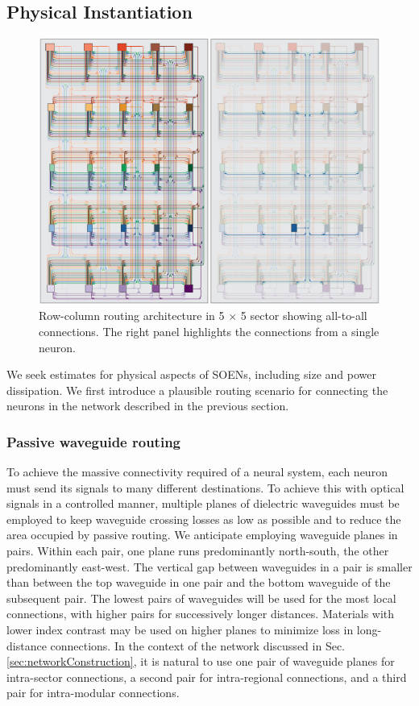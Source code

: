 \documentclass[twocolumn]{article}
\begin{document}
\subsection{\label{sec:physicalInstantiation}Physical Instantiation}
\begin{figure}[t!]
	\centerline{\includegraphics[width=17.2cm]{_networks_routingDiagram_small.pdf}}
	\caption{\label{fig:networks_routingDiagram}Row-column routing architecture in 5 $\times$ 5 sector showing all-to-all connections. The right panel highlights the connections from a single neuron.}
\end{figure}
We seek estimates for physical aspects of SOENs, including size and power dissipation. We first introduce a plausible routing scenario for connecting the neurons in the network described in the previous section. 

\subsubsection{Passive waveguide routing}
To achieve the massive connectivity required of a neural system, each neuron must send its signals to many different destinations. To achieve this with optical signals in a controlled manner, multiple planes of dielectric waveguides \cite{chbu2017,chbu2018,sami2017} must be employed to keep waveguide crossing losses as low as possible and to reduce the area occupied by passive routing. We anticipate employing waveguide planes in pairs. Within each pair, one plane runs predominantly north-south, the other predominantly east-west. The vertical gap between waveguides in a pair is smaller than between the top waveguide in one pair and the bottom waveguide of the subsequent pair. The lowest pairs of waveguides will be used for the most local connections, with higher pairs for successively longer distances. Materials with lower index contrast may be used on higher planes to minimize loss in long-distance connections. In the context of the network discussed in Sec.\,\ref{sec:networkConstruction}, it is natural to use one pair of waveguide planes for intra-sector connections, a second pair for intra-regional connections, and a third pair for intra-modular connections.
\end{document}
